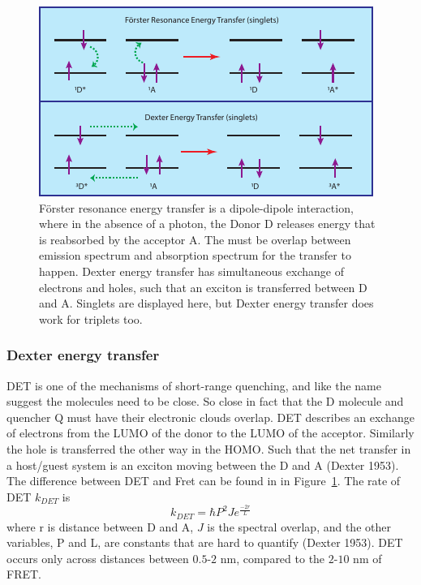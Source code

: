 \documentclass[
  letterpaper,
  DIV=11,
  numbers=noendperiod,
  oneside]{scrreprt}
\begin{document}
\begin{figure}

{\centering \includegraphics{./images/FRET.pdf}

}

\caption{\label{fig-FRET}Förster resonance energy transfer is a
dipole-dipole interaction, where in the absence of a photon, the Donor D
releases energy that is reabsorbed by the acceptor A. The must be
overlap between emission spectrum and absorption spectrum for the
transfer to happen. Dexter energy transfer has simultaneous exchange of
electrons and holes, such that an exciton is transferred between D and
A. Singlets are displayed here, but Dexter energy transfer does work for
triplets too.}

\end{figure}

\hypertarget{dexter-energy-transfer}{%
\subsubsection{Dexter energy transfer}\label{dexter-energy-transfer}}

DET is one of the mechanisms of short-range quenching, and like the name
suggest the molecules need to be close. So close in fact that the D
molecule and quencher Q must have their electronic clouds overlap. DET
describes an exchange of electrons from the LUMO of the donor to the
LUMO of the acceptor. Similarly the hole is transferred the other way in
the HOMO. Such that the net transfer in a host/guest system is an
exciton moving between the D and A (Dexter 1953). The difference between
DET and Fret can be found in in Figure~\ref{fig-FRET}. The rate of DET
\(k_{DET}\) is \[k_{DET} = \hbar P^2Je^\frac{-2r}{L}\] where r is
distance between D and A, \(J\) is the spectral overlap, and the other
variables, P and L, are constants that are hard to quantify (Dexter
1953). DET occurs only across distances between \(0.5\)-\(2\) nm,
compared to the \(2\)-\(10\) nm of FRET.
\end{document}
